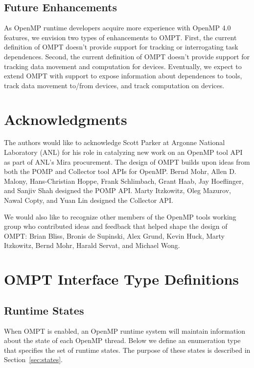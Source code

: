 \documentclass{article}
\begin{document}
\subsection{Future Enhancements}
As OpenMP runtime developers acquire more experience with OpenMP 4.0 features, we  envision two types of enhancements to OMPT.
First, the current definition of OMPT doesn't provide support for tracking or interrogating task dependences.  Second, the current definition of OMPT doesn't provide support for tracking data movement and computation for devices. Eventually, we expect to extend OMPT with support to expose information about dependences to tools, track data movement to/from devices, and track computation on devices.

\section*{Acknowledgments}

The authors would like to acknowledge Scott Parker at Argonne National Laboratory (ANL) for 
his role in catalyzing new work on an OpenMP tool API as part of ANL's Mira procurement.
The design of OMPT builds upon ideas from both the POMP and Collector tool APIs for OpenMP. 
Bernd Mohr, Allen D. Malony, Hans-Christian Hoppe, Frank Schlimbach, 
Grant Haab, Jay Hoeflinger, and Sanjiv Shah designed the POMP API. 
Marty Itzkowitz, Oleg Mazurov, Nawal Copty, and Yuan Lin designed the Collector API.

We would also like to recognize other members of the OpenMP tools working group who contributed ideas and feedback that helped shape the design of  OMPT: Brian Bliss, Bronis de Supinski, Alex Grund, Kevin Huck, Marty Itzkowitz, Bernd Mohr, Harald Servat, and Michael Wong.

 \clearpage
 
 


\appendix
\clearpage


\section{OMPT Interface Type Definitions}
\label{appendix:ompt-types}
\subsection{Runtime States}
\label{appendix:ompt-types:states}

When OMPT is enabled, an OpenMP runtime system will maintain information about the state of  each OpenMP thread. 
Below we define an enumeration type that specifies the set of runtime states. 
The purpose of these states is described in Section~\ref{sec:states}.
\end{document}

